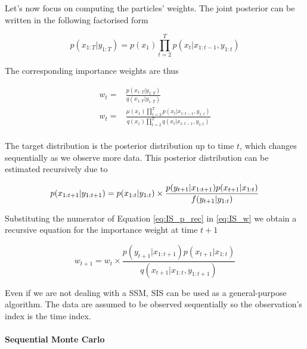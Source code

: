 Let's now focus on computing the particles' weights. The joint posterior can be written in the following factorised form

$$ p(x_{1:T}|y_{1:T}) = p(x_1) \prod_{t=2}^T p(x_t|x_{1:t-1},y_{1:t}) $$

The corresponding importance weights are thus

\begin{equation} \label{eq:IS_w}
\begin{aligned}
w_t =& \frac{p(x_{1:T}|y_{1:T})}{q(x_{1:T}|y_{1:T})} \\
w_t =& \frac{\mu(x_1) \prod_{t=2}^T p(x_t|x_{1:t-1},y_{1:t})}{q(x_1) \prod_{t=2}^T q(x_t|x_{1:t-1},y_{1:t})} \\
\end{aligned}
\end{equation}

The target distribution is the posterior distribution up to time $t$, which changes sequentially as we observe more data. This posterior distribution can be estimated recursively due to

\begin{equation} \label{eq:IS_p_rec}
p(x_{1:t+1}|y_{1:t+1}) = p(x_{1:t}|y_{1:t}) \times \frac{p(y_{t+1}|x_{1:t+1})p(x_{t+1}|x_{1:t})}{f(y_{t+1}|y_{1:t})} \\
\end{equation}

Substituting the numerator of Equation \ref{eq:IS_p_rec} in \ref{eq:IS_w} we obtain a recursive equation for the importance weight at time $t+1$

$$ w_{t+1} = w_{t} \times \frac{p(y_{t+1}|x_{1:t+1})p(x_{t+1}|x_{1:t})}{q(x_{t+1}|x_{1:t},y_{1:t+1})} $$


Even if we are not dealing with a \gls{SSM}, \gls{SIS} can be used as a general-purpose algorithm. The data are assumed to be observed sequentially so the observation’s index is the time index.


\paragraph{Sequential Monte Carlo} \label{SMC}


